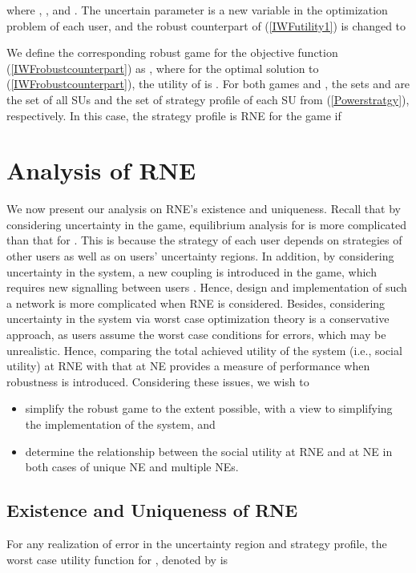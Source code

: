 \documentclass[peerreview,onecolumn,11pt,draftclsnofoot]{IEEEtran}\usepackage{amsmath}\usepackage{amsfonts}\usepackage{epsfig}\usepackage{amssymb}\usepackage{graphicx}\usepackage{amssymb,amsmath}\usepackage{cite}\usepackage{color,soul}\newcommand\T{\rule{0pt}{3.1ex}}
\begin{document}
where , , and .
The uncertain parameter is a new variable in the optimization problem of each user, and the robust counterpart of (\ref{IWFutility1}) is changed \cite{selecectedrobust} to

 
We define the corresponding robust game for the objective function (\ref{IWFrobustcounterpart}) as , where for the optimal solution to (\ref{IWFrobustcounterpart}), the utility of
 is
.
For both games  and , the sets  and  are the set of all SUs
and the set of strategy profile of each SU from
(\ref{Powerstratgy}), respectively. In this case, the strategy
profile  is RNE for the game
 if


\section{Analysis of RNE}
We now present our analysis on RNE's existence and uniqueness. Recall that by considering uncertainty in the game, equilibrium analysis for  is more complicated than that for . This is because the strategy of each user depends on strategies of other users as well as on users' uncertainty regions. In addition, by considering uncertainty in the system, a new coupling is introduced in the game, which requires new signalling between users \cite{Robustnew}. Hence, design and implementation of such a network is more complicated when RNE is considered. Besides, considering uncertainty in the system via worst case optimization theory is a conservative approach, as users assume the worst case conditions for errors, which may be unrealistic. Hence, comparing the total achieved utility of the system (i.e., social utility) at RNE with that at NE provides a measure of performance when robustness is introduced. Considering these issues, we wish to
\begin{itemize}
  \item simplify the robust game to the extent possible, with a view to simplifying the implementation of the system, and
  \item determine the relationship between the social utility at RNE and at NE in both cases of unique NE and multiple NEs.
\end{itemize}

\subsection{Existence and Uniqueness of RNE}

For any realization of error in the uncertainty region and strategy profile, the worst case utility function for , denoted by  is
\end{document}
